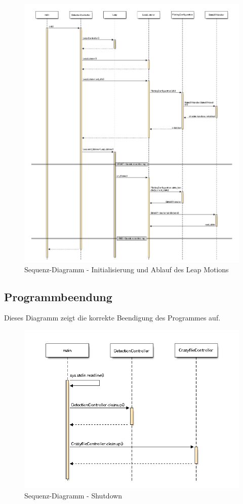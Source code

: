 \begin{figure}[H]
	\centering
	\includegraphics[width=1.0\textwidth]{figures/poc/seq_dia_detection.png}
	\caption{Sequenz-Diagramm - Initialisierung und Ablauf des Leap Motions}
\end{figure}

\clearpage
\subsection{Programmbeendung}
Dieses Diagramm zeigt die korrekte Beendigung des Programmes auf.

\begin{figure}[H]
	\centering
	\includegraphics[width=1.0\textwidth]{figures/poc/seq_dia_shutdown.png}
	\caption{Sequenz-Diagramm - Shutdown}
\end{figure}


